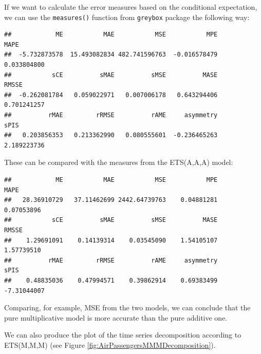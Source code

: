 \documentclass[]{book}
\newenvironment{Shaded}{\begin{snugshade}}{\end{snugshade}}
\newcommand{\KeywordTok}[1]{\textcolor[rgb]{0.13,0.29,0.53}{\textbf{#1}}}
\newcommand{\NormalTok}[1]{#1}
\newcommand{\OperatorTok}[1]{\textcolor[rgb]{0.81,0.36,0.00}{\textbf{#1}}}
\theoremstyle{definition}
\theoremstyle{definition}
\theoremstyle{definition}
\theoremstyle{definition}
\theoremstyle{remark}
\begin{document}
If we want to calculate the error measures based on the conditional expectation, we can use the \texttt{measures()} function from \texttt{greybox} package the following way:

\begin{Shaded}
\end{Shaded}

\begin{verbatim}
##            ME           MAE           MSE           MPE          MAPE 
##  -5.732873578  15.493082834 482.741596763  -0.016578479   0.033804800 
##           sCE          sMAE          sMSE          MASE         RMSSE 
##  -0.262081784   0.059022971   0.007006178   0.643294406   0.701241257 
##          rMAE         rRMSE          rAME     asymmetry          sPIS 
##   0.203856353   0.213362990   0.080555601  -0.236465263   2.189223736
\end{verbatim}

These can be compared with the measures from the ETS(A,A,A) model:

\begin{Shaded}
\end{Shaded}

\begin{verbatim}
##            ME           MAE           MSE           MPE          MAPE 
##   28.36910729   37.11462699 2442.64739763    0.04881281    0.07053896 
##           sCE          sMAE          sMSE          MASE         RMSSE 
##    1.29691091    0.14139314    0.03545090    1.54105107    1.57739510 
##          rMAE         rRMSE          rAME     asymmetry          sPIS 
##    0.48835036    0.47994571    0.39862914    0.69383499   -7.31044007
\end{verbatim}

Comparing, for example, MSE from the two models, we can conclude that the pure multiplicative model is more accurate than the pure additive one.

We can also produce the plot of the time series decomposition according to ETS(M,M,M) (see Figure \ref{fig:AirPassengersMMMDecomposition}).
\end{document}
